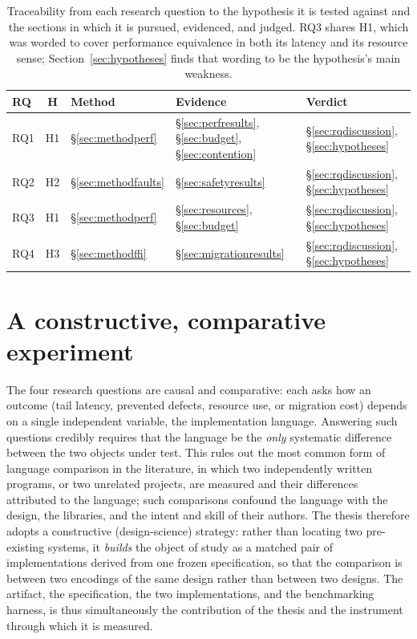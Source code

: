 \documentclass[english,twoside,openright,a4paper,censored,csm,software-track-2020]{HYthesisML}
\begin{document}
\begin{table}
\centering
\small
\caption[Traceability from question to hypothesis, evidence, and verdict]{Traceability from each research question to the hypothesis it is tested against and
the sections in which it is pursued, evidenced, and judged. RQ3 shares H1, which was worded to
cover performance equivalence in both its latency and its resource sense;
Section~\ref{sec:hypotheses} finds that wording to be the hypothesis's main
weakness.\label{tab:traceability}}
\renewcommand{\arraystretch}{1.25}
\begin{tabular}{@{}l c l l l@{}}
\hline\hline
RQ & H & Method & Evidence & Verdict \\
\hline
RQ1 & H1 & \S\ref{sec:methodperf} & \S\ref{sec:perfresults}, \S\ref{sec:budget}, \S\ref{sec:contention} & \S\ref{sec:rqdiscussion}, \S\ref{sec:hypotheses} \\
RQ2 & H2 & \S\ref{sec:methodfaults} & \S\ref{sec:safetyresults} & \S\ref{sec:rqdiscussion}, \S\ref{sec:hypotheses} \\
RQ3 & H1 & \S\ref{sec:methodperf} & \S\ref{sec:resources}, \S\ref{sec:budget} & \S\ref{sec:rqdiscussion}, \S\ref{sec:hypotheses} \\
RQ4 & H3 & \S\ref{sec:methodffi} & \S\ref{sec:migrationresults} & \S\ref{sec:rqdiscussion}, \S\ref{sec:hypotheses} \\
\hline
\end{tabular}
\end{table}

\section{A constructive, comparative experiment}
The four research questions are causal and comparative: each asks how an outcome (tail
latency, prevented defects, resource use, or migration cost) depends on a single independent
variable, the implementation language. Answering such questions credibly requires that the
language be the \emph{only} systematic difference between the two objects under test. This
rules out the most common form of language comparison in the literature, in which two
independently written programs, or two unrelated projects, are measured and their differences
attributed to the language; such comparisons confound the language with the design, the
libraries, and the intent and skill of their authors. The thesis therefore adopts a
constructive (design-science) strategy: rather than locating two pre-existing systems, it
\emph{builds} the object of study as a matched pair of implementations derived from one frozen
specification, so that the comparison is between two encodings of the same design rather than
between two designs. The artifact, the specification, the two implementations, and the
benchmarking harness, is thus simultaneously the contribution of the thesis and the instrument
through which it is measured.
\end{document}
